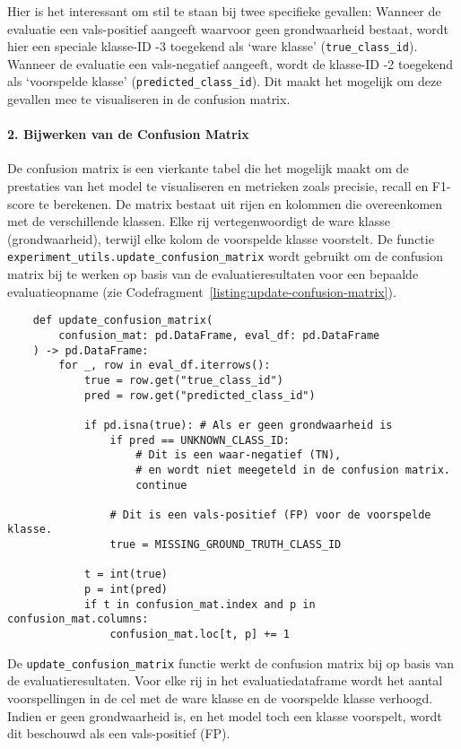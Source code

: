 Hier is het interessant om stil te staan bij twee specifieke gevallen:
Wanneer de evaluatie een vals-positief aangeeft waarvoor geen grondwaarheid bestaat, wordt hier een speciale klasse-ID -3 toegekend als `ware klasse' (\texttt{true\_class\_id}).
Wanneer de evaluatie een vals-negatief aangeeft, wordt de klasse-ID -2 toegekend als `voorspelde klasse' (\texttt{predicted\_class\_id}).
Dit maakt het mogelijk om deze gevallen mee te visualiseren in de confusion matrix.

\paragraph{2. Bijwerken van de Confusion Matrix}
De confusion matrix is een vierkante tabel die het mogelijk maakt om de prestaties van het model te visualiseren en metrieken zoals precisie, recall en F1-score te berekenen.
De matrix bestaat uit rijen en kolommen die overeenkomen met de verschillende klassen.
Elke rij vertegenwoordigt de ware klasse (grondwaarheid), terwijl elke kolom de voorspelde klasse voorstelt.
De functie \texttt{experiment\_utils.update\_confusion\_matrix} wordt gebruikt om de confusion matrix bij 
te werken op basis van de evaluatieresultaten voor een bepaalde evaluatieopname (zie Codefragment~\ref{listing:update-confusion-matrix}).

\begin{listing}[H]
  \begin{verbatim}
    def update_confusion_matrix(
        confusion_mat: pd.DataFrame, eval_df: pd.DataFrame
    ) -> pd.DataFrame:
        for _, row in eval_df.iterrows():
            true = row.get("true_class_id")
            pred = row.get("predicted_class_id")

            if pd.isna(true): # Als er geen grondwaarheid is
                if pred == UNKNOWN_CLASS_ID:
                    # Dit is een waar-negatief (TN), 
                    # en wordt niet meegeteld in de confusion matrix.
                    continue

                # Dit is een vals-positief (FP) voor de voorspelde klasse.
                true = MISSING_GROUND_TRUTH_CLASS_ID

            t = int(true)
            p = int(pred)
            if t in confusion_mat.index and p in confusion_mat.columns:
                confusion_mat.loc[t, p] += 1
  \end{verbatim}
  \caption[Functie voor het bijwerken van de confusion matrix]{
      \label{listing:update-confusion-matrix}
        De \texttt{update\_confusion\_matrix} functie werkt de confusion matrix bij op basis van de evaluatieresultaten.
        Voor elke rij in het evaluatiedataframe wordt het aantal voorspellingen in de cel met de ware klasse en de voorspelde klasse verhoogd.
        Indien er geen grondwaarheid is, en het model toch een klasse voorspelt, wordt dit beschouwd als een vals-positief (FP).
      }
\end{listing}

